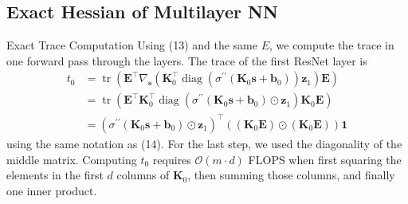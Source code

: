 \documentclass{article}
\begin{document}
\subsection{Exact Hessian of Multilayer NN}
\begin{flushleft}
    Exact Trace Computation Using (13) and the same $E$, we compute the trace in one forward pass through the layers. The trace of the first ResNet layer is
$$
\begin{aligned}
t_{0} &=\operatorname{tr}\left(\boldsymbol{E}^{\top} \nabla_{\boldsymbol{s}}\left(\boldsymbol{K}_{0}^{\top} \operatorname{diag}\left(\sigma^{\prime \prime}\left(\boldsymbol{K}_{0} \boldsymbol{s}+\boldsymbol{b}_{0}\right)\right) \boldsymbol{z}_{1}\right) \boldsymbol{E}\right) \\
&=\operatorname{tr}\left(\boldsymbol{E}^{\top} \boldsymbol{K}_{0}^{\top} \operatorname{diag}\left(\sigma^{\prime \prime}\left(\boldsymbol{K}_{0} \boldsymbol{s}+\boldsymbol{b}_{0}\right) \odot \boldsymbol{z}_{1}\right) \boldsymbol{K}_{0} \boldsymbol{E}\right) \\
&=\left(\sigma^{\prime \prime}\left(\boldsymbol{K}_{0} \boldsymbol{s}+\boldsymbol{b}_{0}\right) \odot \boldsymbol{z}_{1}\right)^{\top}\left(\left(\boldsymbol{K}_{0} \boldsymbol{E}\right) \odot\left(\boldsymbol{K}_{0} \boldsymbol{E}\right)\right) \mathbf{1}
\end{aligned}
$$
using the same notation as (14). For the last step, we used the diagonality of the middle matrix. Computing $t_{0}$ requires $\mathcal{O}(m \cdot d)$ FLOPS when first squaring the elements in the first $d$ columns of $\boldsymbol{K}_{0}$, then summing those columns, and finally one inner product.


\end{flushleft}
\end{document}
